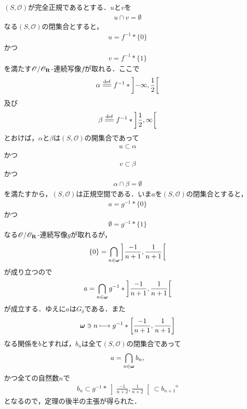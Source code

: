 	\begin{sketch}
		$(S,\mathscr{O})$が完全正規であるとする．$u$と$v$を
		\begin{align}
			u \cap v = \emptyset
		\end{align}
		なる$(S,\mathscr{O})$の閉集合とすると，
		\begin{align}
			u = f^{-1} \ast \{0\}
		\end{align}
		かつ
		\begin{align}
			v = f^{-1} \ast \{1\}
		\end{align}
		を満たす$\mathscr{O}/\mathscr{O}_{\mathbf{R}}$-連続写像$f$が取れる．ここで
		\begin{align}
			\alpha \defeq f^{-1} \ast \left] -\infty,\frac{1}{2} \right[
		\end{align}
		及び
		\begin{align}
			\beta \defeq f^{-1} \ast \left] \frac{1}{2},\infty \right[
		\end{align}
		とおけば，$\alpha$と$\beta$は$(S,\mathscr{O})$の開集合であって
		\begin{align}
			u \subset \alpha 
		\end{align}
		かつ
		\begin{align}
			v \subset \beta
		\end{align}
		かつ
		\begin{align}
			\alpha \cap \beta = \emptyset
		\end{align}
		を満たすから，$(S,\mathscr{O})$は正規空間である．いま$a$を$(S,\mathscr{O})$の閉集合とすると，
		\begin{align}
			a = g^{-1} \ast \{0\}
		\end{align}
		かつ
		\begin{align}
			\emptyset = g^{-1} \ast \{1\}
		\end{align}
		なる$\mathscr{O}/\mathscr{O}_{\mathbf{R}}$-連続写像$g$が取れるが，
		\begin{align}
			\{0\} = \bigcap_{n \in {\boldsymbol \omega}} \left]\frac{-1}{n+1},\frac{1}{n+1}\right[
		\end{align}
		が成り立つので
		\begin{align}
			a = \bigcap_{n \in {\boldsymbol \omega}} g^{-1} \ast \left]\frac{-1}{n+1},\frac{1}{n+1}\right[
		\end{align}
		が成立する．ゆえに$a$は$G_\delta$である．また
		\begin{align}
			{\boldsymbol \omega} \ni n \longmapsto g^{-1} \ast \left[\frac{-1}{n+1},\frac{1}{n+1}\right]
		\end{align}
		なる関係を$b$とすれば，$b_n$は全て$(S,\mathscr{O})$の閉集合であって
		\begin{align}
			a = \bigcap_{n \in {\boldsymbol \omega}} b_n,
		\end{align}
		かつ全ての自然数$n$で
		\begin{align}
			b_n \subset g^{-1} \ast \left]\frac{-1}{n+2},\frac{1}{n+2}\right[ \subset {b_{n+1}}^{\mathrm{o}}
		\end{align}
		となるので，定理の後半の主張が得られた．
		

\end{sketch}
